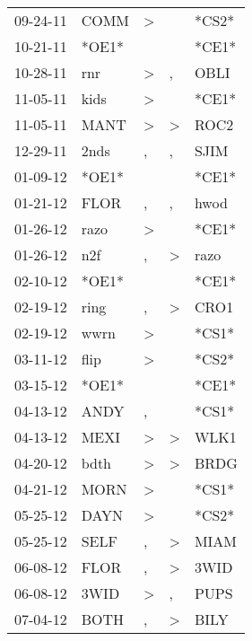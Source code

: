 \begin{supertabular}{lllll}
 09-24-11 &   COMM &     \textgreater &                  &  *CS2* \\
 10-21-11 &  *OE1* &                  &                  &  *CE1* \\
 10-28-11 &    rnr &     \textgreater &                , &   OBLI \\
 11-05-11 &   kids &     \textgreater &                  &  *CE1* \\
 11-05-11 &   MANT &     \textgreater &     \textgreater &   ROC2 \\
 12-29-11 &   2nds &                , &                , &   SJIM \\
 01-09-12 &  *OE1* &                  &                  &  *CE1* \\
 01-21-12 &   FLOR &                , &                , &   hwod \\
 01-26-12 &   razo &     \textgreater &                  &  *CE1* \\
 01-26-12 &    n2f &                , &     \textgreater &   razo \\
 02-10-12 &  *OE1* &                  &                  &  *CE1* \\
 02-19-12 &   ring &                , &     \textgreater &   CRO1 \\
 02-19-12 &   wwrn &     \textgreater &                  &  *CS1* \\
 03-11-12 &   flip &     \textgreater &                  &  *CS2* \\
 03-15-12 &  *OE1* &                  &                  &  *CE1* \\
 04-13-12 &   ANDY &                , &                  &  *CS1* \\
 04-13-12 &   MEXI &     \textgreater &     \textgreater &   WLK1 \\
 04-20-12 &   bdth &     \textgreater &     \textgreater &   BRDG \\
 04-21-12 &   MORN &     \textgreater &                  &  *CS1* \\
 05-25-12 &   DAYN &     \textgreater &                  &  *CS2* \\
 05-25-12 &   SELF &                , &     \textgreater &   MIAM \\
 06-08-12 &   FLOR &                , &     \textgreater &   3WID \\
 06-08-12 &   3WID &     \textgreater &                , &   PUPS \\
 07-04-12 &   BOTH &                , &     \textgreater &   BILY \\

\end{supertabular}
